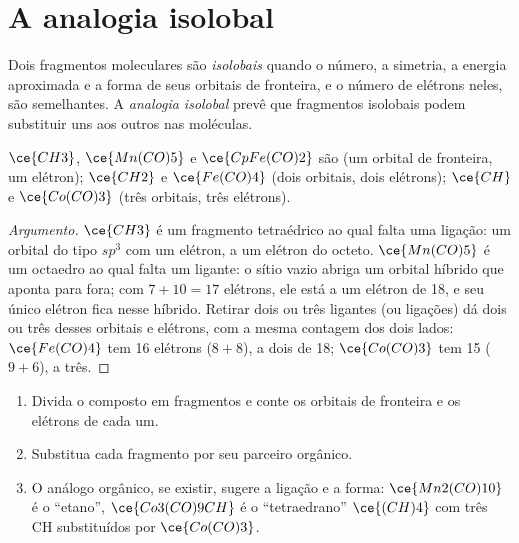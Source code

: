 \section{A analogia isolobal}

\begin{definition}\label{def:b3:organometallic-bonding:isolobal}
Dois fragmentos moleculares são \emph{isolobais} quando o
número, a simetria, a energia aproximada e a forma de seus orbitais de fronteira, e o
número de elétrons neles, são semelhantes. A \emph{analogia
isolobal} prevê que fragmentos isolobais podem substituir uns aos
outros nas moléculas.
\end{definition}

\begin{proposition}\label{prop:b3:organometallic-bonding:isolobal}
$\ce{CH3}$, $\ce{Mn(CO)5}$ e $\ce{CpFe(CO)2}$ são  (um orbital de fronteira, um elétron);
$\ce{CH2}$ e $\ce{Fe(CO)4}$ (dois orbitais, dois elétrons); $\ce{CH}$ e $\ce{Co(CO)3}$ (três orbitais,
três elétrons).
\end{proposition}

\begin{proof}[Argumento]
$\ce{CH3}$ é um fragmento tetraédrico ao qual falta uma ligação: um orbital do tipo $sp^3$ com um
elétron, a um elétron do octeto. $\ce{Mn(CO)5}$ é um octaedro ao qual falta um ligante: o
sítio vazio abriga um orbital híbrido que aponta para fora; com $7 + 10 = 17$ elétrons, ele está a um
elétron de 18, e seu único elétron fica nesse híbrido. Retirar dois ou três
ligantes (ou ligações) dá dois ou três desses orbitais e elétrons, com a
mesma contagem dos dois lados: $\ce{Fe(CO)4}$ tem 16 elétrons ($8 + 8$), a dois de 18;
$\ce{Co(CO)3}$ tem 15 ($9 + 6$), a três.
\end{proof}

\begin{method}\label{met:b3:organometallic-bonding:isolobal}
\begin{enumerate}
  \item Divida o composto em fragmentos e conte os orbitais de fronteira e os elétrons
        de cada um.
  \item Substitua cada fragmento por seu parceiro  orgânico.
  \item O análogo orgânico, se existir, sugere a ligação e a forma:
        $\ce{Mn2(CO)10}$ é o ``etano'', $\ce{Co3(CO)9CH}$ é o ``tetraedrano'' $\ce{(CH)4}$ com três CH
        substituídos por $\ce{Co(CO)3}$.
\end{enumerate}
\end{method}

